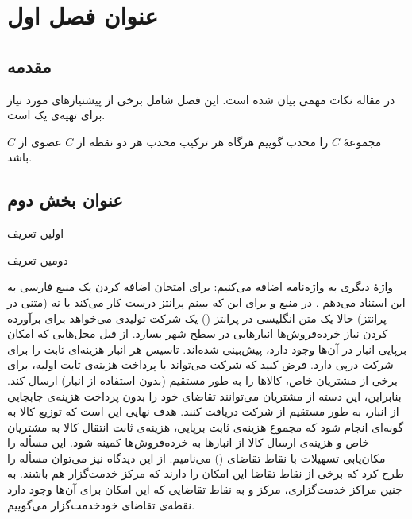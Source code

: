 \chapter{عنوان فصل اول }
\section{مقدمه}

در مقاله \cite{salas2024vendor} نکات مهمی بیان شده است.
این فصل
 شامل برخی از پیشنیازهای  مورد نیاز برای تهیه‌ی یک   است.
\begin{definition}
مجموعهٔ $C$ را محدب گوییم هرگاه هر ترکیب محدب هر دو نقطه از $C$ عضوی از $C$ باشد.
\end{definition}
\section{عنوان بخش دوم}

\begin{definition}
اولین تعریف
\end{definition}


\begin{definition}
دومین تعریف
\end{definition}


واژهٔ دیگری به واژه‌نامه اضافه می‌کنیم: 
برای امتحان اضافه کردن یک منبع فارسی به این استناد می‌دهم \cite{irscholar494611}. در منبع   \cite{glasner2007enveloping} و \cite{diestel2012sequences} برای این که ببینم پرانتز درست کار می‌کند یا نه (متنی در پرانتز) حالا یک متن انگلیسی در پرانتز ()
یک شرکت   تولیدی می‌خواهد برای برآورده کردن نیاز خرده‌فروش‌ها انبارهایی در سطح شهر بسازد. از قبل محل‌هایی که امکان برپایی انبار در آن‌ها وجود دارد، پیش‌بینی شده‌اند. تاسیس هر انبار هزینه‌‌ای ثابت را برای شرکت درپی دارد. فرض کنید که شرکت می‌تواند با پرداخت هزینه‌ی ثابت اولیه، برای برخی از مشتریان خاص، کالاها را به طور مستقیم (بدون استفاده از انبار) ارسال کند. بنابراین، این دسته از مشتریان می‌توانند تقاضای خود را  بدون  پرداخت هزینه‌ی جابجایی از انبار، به طور مستقیم از شرکت دریافت کنند. هدف نهایی این است که توزیع کالا به گونه‌ای انجام شود که مجموع هزینه‌ی ثابت برپایی، هزینه‌ی ثابت انتقال کالا به مشتریان خاص و هزینه‌ی ارسال کالا از انبارها به خرده‌فروش‌ها کمینه شود.  این مسأله را مکان‌یابی تسهیلات با نقاط تقاضای    () می‌نامیم. از این دیدگاه نیز می‌توان مسأله را طرح کرد که برخی از نقاط تقاضا این امکان را دارند که مرکز خدمت‌گزار هم باشند. به چنین مراکز خدمت‌گزاری، مرکز   و به نقاط تقاضایی که این امکان برای آن‌ها وجود دارد  نقطه‌ی تقاضای خودخدمت‌گزار  می‌گوییم. 

